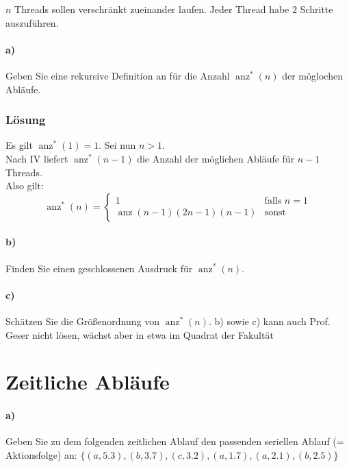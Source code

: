 \documentclass[a4paper]{scrartcl}
\DeclareMathOperator{\anz}{anz}
\begin{document}
$n $ Threads sollen verschränkt zueinander laufen. Jeder Thread habe $ 2 $ Schritte auszuführen.

\paragraph{a)} Geben Sie eine rekursive Definition an für die Anzahl $ \anz^*(n) $ der möglochen Abläufe.

\subsubsection*{Lösung}
Es gilt $ \anz^*(1) = 1 $. Sei nun $ n > 1 $.\\
Nach IV liefert $ \anz^*(n - 1) $ die Anzahl der möglichen Abläufe für $ n - 1 $ Threads.\\



Also gilt:\\
\begin{equation*}
\anz^*(n) = 
\begin{cases}
1 & \text{falls } n = 1\\
\anz(n - 1) (2n - 1) (n - 1) & \text{sonst}
\end{cases}
\end{equation*}

\paragraph{b)} Finden Sie einen geschlossenen Ausdruck für $ \anz^*(n) $.
\paragraph{c)} Schätzen Sie die Größenordnung von $ \anz^*(n) $.
b) sowie c) kann auch Prof. Geser nicht lösen, wächst aber in etwa im Quadrat der Fakultät

\section{Zeitliche Abläufe}

\paragraph{a)} Geben Sie zu dem folgenden zeitlichen Ablauf den passenden seriellen Ablauf (= Aktionsfolge) an:
$ \{(a, 5.3), (b, 3.7), (c, 3.2), (a, 1.7), (a, 2.1), (b, 2.5)\} $
\end{document}
